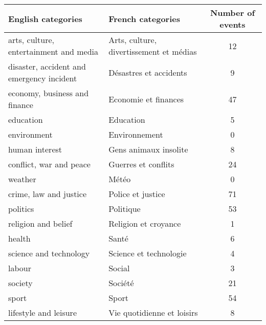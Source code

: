 \begin{tabular}{llc}
\hline
                        English categories &                        French categories &  Number of events \\
\hline
    arts, culture, entertainment and media &  Arts, culture, divertissement et médias &                12 \\
 disaster, accident and emergency incident &                   Désastres et accidents &                 9 \\
             economy, business and finance &                     Economie et finances &                47 \\
                                 education &                                Education &                 5 \\
                               environment &                            Environnement &                 0 \\
                            human interest &                    Gens animaux insolite &                 8 \\
                   conflict, war and peace &                      Guerres et conflits &                24 \\
                                   weather &                                    Météo &                 0 \\
                    crime, law and justice &                        Police et justice &                71 \\
                                  politics &                                Politique &                53 \\
                       religion and belief &                     Religion et croyance &                 1 \\
                                    health &                                    Santé &                 6 \\
                    science and technology &                   Science et technologie &                 4 \\
                                    labour &                                   Social &                 3 \\
                                   society &                                  Société &                21 \\
                                     sport &                                    Sport &                54 \\
                     lifestyle and leisure &               Vie quotidienne et loisirs &                 8 \\
\hline
\end{tabular}
